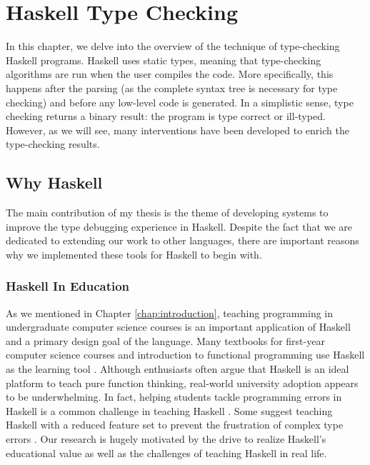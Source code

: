 
\chapter{Haskell Type Checking} %

\label{chap:haskell-type-checking}

\graphicspath{{Figures/HaskellTypeChecking}}
In this chapter, we delve into the overview of the technique of type-checking Haskell programs. Haskell uses static types, meaning that type-checking algorithms are run when the user compiles the code. More specifically, this happens after the parsing (as the complete syntax tree is necessary for type checking) and before any low-level code is generated. In a simplistic sense, type checking returns a binary result: the program is type correct or ill-typed. However, as we will see, many interventions have been developed to enrich the type-checking results.

\section{Why Haskell}

The main contribution of my thesis is the theme of developing systems to improve the type debugging experience in Haskell. Despite the fact that we are dedicated to extending our work to other languages, there are important reasons why we implemented these tools for Haskell to begin with.

\subsection{Haskell In Education}

As we mentioned in Chapter \ref{chap:introduction}, teaching programming in undergraduate computer science courses is an important application of Haskell and a primary design goal of the language.  Many textbooks for first-year computer science courses and introduction to functional programming use Haskell as the learning tool \cite{Bird1998-kv, Davie1992-xv}. Although enthusiasts often argue that Haskell is an ideal platform to teach pure function thinking, real-world university adoption appears to be underwhelming. In fact, helping students tackle programming errors in Haskell is a common challenge in teaching Haskell \cite{Jun2000-yu, Tirronen2015-nr}. Some suggest teaching Haskell with a reduced feature set to prevent the frustration of complex type errors \cite{Heeren2003-mz}. Our research is hugely motivated by the drive to realize Haskell's educational value as well as the challenges of teaching Haskell in real life.

